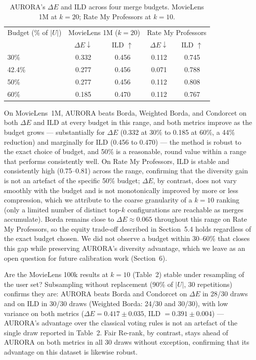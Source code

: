 \documentclass[runningheads]{llncs}
\begin{document}
\begin{table}[h!]
\caption{AURORA's $\Delta E$ and ILD across four merge budgets.
MovieLens 1M at $k=20$; Rate My Professors at $k=10$.}
\label{tab:robustness}
\centering
\begin{tabular}{lcccc}
\hline
Budget ($\%$ of $|U|$) & \multicolumn{2}{c}{MovieLens 1M ($k=20$)} &
\multicolumn{2}{c}{Rate My Professors} \\
 & $\Delta E \downarrow$ & ILD $\uparrow$ & $\Delta E \downarrow$ &
ILD $\uparrow$ \\
\hline
30\%   & 0.332 & 0.456 & 0.112 & 0.745 \\
42.4\% & 0.277 & 0.456 & 0.071 & 0.788 \\
50\%   & 0.277 & 0.456 & 0.112 & 0.808 \\
60\%   & 0.185 & 0.470 & 0.112 & 0.767 \\
\hline
\end{tabular}
\end{table}

On MovieLens~1M, AURORA beats Borda, Weighted Borda, and Condorcet on both
$\Delta E$ and ILD at every budget in this range, and both metrics improve
as the budget grows --- substantially for $\Delta E$ (0.332 at 30\% to
0.185 at 60\%, a 44\% reduction) and marginally for ILD (0.456 to 0.470)
--- the method is robust to the exact choice of budget, and 50\% is a
reasonable, round value within a range that performs consistently well. On Rate My Professors, ILD is stable and
consistently high (0.75--0.81) across the range, confirming that the
diversity gain is not an artefact of the specific 50\% budget; $\Delta E$,
by contrast, does not vary smoothly with the budget and is not
monotonically improved by more or less compression, which we attribute to
the coarse granularity of a $k=10$ ranking (only a limited number of
distinct top-$k$ configurations are reachable as merges accumulate). Borda
remains close to $\Delta E \approx 0.065$ throughout this range on Rate My
Professors, so the equity trade-off described in Section~5.4 holds
regardless of the exact budget chosen. We did not observe a budget within
30--60\% that closes this gap while preserving AURORA's diversity
advantage, which we leave as an open question for future calibration
work (Section~6).

Are the MovieLens 100k results at $k=10$ (Table~2) stable under
resampling of the user set? Subsampling without replacement (90\% of
$|U|$, 30 repetitions) confirms they are: AURORA beats Borda and
Condorcet on $\Delta E$ in 28/30 draws and on ILD in 30/30 draws
(Weighted Borda: 24/30 and 30/30), with low variance on both metrics
($\Delta E = 0.417 \pm 0.035$, ILD $= 0.391 \pm 0.004$) --- AURORA's
advantage over the classical voting rules is not an artefact of the
single draw reported in Table~2. Fair Re-rank, by contrast, stays ahead
of AURORA on both metrics in all 30 draws without exception, confirming
that its advantage on this dataset is likewise robust.
\end{document}
